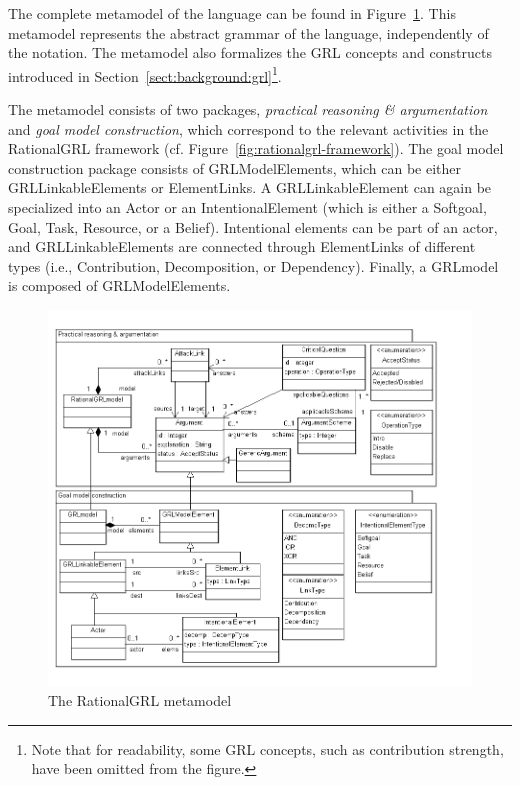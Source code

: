 The complete metamodel of the language can be found in Figure~\ref{fig:metamodel}. This metamodel represents the abstract grammar of the language, independently of the notation. The metamodel also formalizes the GRL concepts and constructs introduced in Section~\ref{sect:background:grl}\footnote{Note that for readability, some GRL concepts, such as contribution strength, have been omitted from the figure.}.

The metamodel consists of two packages, \emph{practical reasoning \& argumentation} and \emph{goal model construction}, which correspond to the relevant activities in the RationalGRL framework (cf. Figure~\ref{fig:rationalgrl-framework}). The goal model construction package consists of \textsf{GRLModelElements}, which can be either \textsf{GRLLinkableElements} or \textsf{ElementLinks}. A \textsf{GRLLinkableElement} can again be specialized into an \textsf{Actor} or an \textsf{IntentionalElement} (which is either a \textsf{Softgoal}, \textsf{Goal}, \textsf{Task}, \textsf{Resource}, or a \textsf{Belief}). Intentional elements can be part of an actor, and \textsf{GRLLinkableElements} are connected through \textsf{ElementLinks} of different types (i.e., \textsf{Contribution, Decomposition}, or \textsf{Dependency}). Finally, a \textsf{GRLmodel} is composed of \textsf{GRLModelElements}.

\begin{figure}[t]
\includegraphics[width=\textwidth]{metamodel/metamodel}
\caption{The RationalGRL metamodel}
\label{fig:metamodel}
\end{figure}

